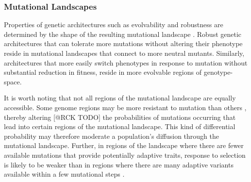 \documentclass[letterpaper]{article}
\begin{document}
\subsubsection{Mutational Landscapes}
Properties of genetic architectures such as evolvability and robustness are determined by the shape of the resulting mutational landscape \citep{andreas_wagner_robustness_2008}. Robust genetic architectures that can tolerate more mutations without altering their phenotype reside in mutational landscapes that connect to more neutral mutants. Similarly, architectures that more easily switch phenotypes in response to mutation without substantial reduction in fitness, reside in more evolvable regions of genotype-space.

It is worth noting that not all regions of the mutational landscape are equally accessible. Some genome regions may be more resistant to mutation than others \citep{lee_rate_2012}, thereby altering [@RCK TODO] the probabilities of mutations occurring that lead into certain regions of the mutational landscape. This kind of differential probability may therefore moderate a population's diffusion through the mutational landscape.
% 
% 
Further, in regions of the landscape where there are fewer available mutations that provide potentially adaptive traits, response to selection is likely to be weaker than in regions where there are many adaptive variants available within a few mutational steps \citep{alberch_genes_1991,carter_role_2005}.

\end{document}
